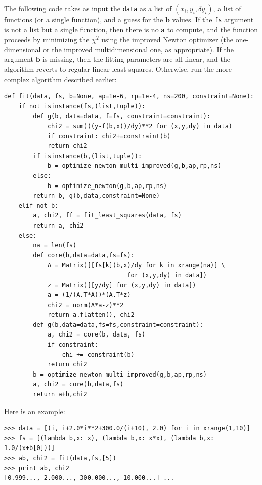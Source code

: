 \documentclass[justified,sixbynine]{tufte-book}
\def\ft{\small\tt}
\theoremstyle{plain}%
\theoremstyle{definition}
\theoremstyle{remark}
\begin{document}
\begin{fullwidth}
The following code takes as input the {\ft data} as a list of $(x_i,y_i,\delta y_i)$, a list of functions (or a single function), and a guess for the $\mathbf{b}$ values. If the {\ft fs} argument is not a list but a single function, then there is no $\mathbf{a}$ to compute, and the function proceeds by minimizing the $\chi^2$ using the improved Newton optimizer (the one-dimensional or the improved multidimensional one, as appropriate). If the argument $\mathbf{b}$ is missing, then the fitting parameters are all linear, and the algorithm reverts to regular linear least squares. Otherwise, run the more complex algorithm described earlier:

\begin{lstlisting}[caption={in file: {\ft nlib.py}}]
def fit(data, fs, b=None, ap=1e-6, rp=1e-4, ns=200, constraint=None):
    if not isinstance(fs,(list,tuple)):
        def g(b, data=data, f=fs, constraint=constraint):
            chi2 = sum(((y-f(b,x))/dy)**2 for (x,y,dy) in data)
            if constraint: chi2+=constraint(b)
            return chi2
        if isinstance(b,(list,tuple)):
            b = optimize_newton_multi_improved(g,b,ap,rp,ns)
        else:
            b = optimize_newton(g,b,ap,rp,ns)
        return b, g(b,data,constraint=None)
    elif not b:
        a, chi2, ff = fit_least_squares(data, fs)
        return a, chi2
    else:
        na = len(fs)
        def core(b,data=data,fs=fs):
            A = Matrix([[fs[k](b,x)/dy for k in xrange(na)] \
                                  for (x,y,dy) in data])
            z = Matrix([[y/dy] for (x,y,dy) in data])
            a = (1/(A.T*A))*(A.T*z)
            chi2 = norm(A*a-z)**2
            return a.flatten(), chi2
        def g(b,data=data,fs=fs,constraint=constraint):
            a, chi2 = core(b, data, fs)
            if constraint:
                chi += constraint(b)
            return chi2
        b = optimize_newton_multi_improved(g,b,ap,rp,ns)
        a, chi2 = core(b,data,fs)
        return a+b,chi2
\end{lstlisting}

Here is an example:

\begin{lstlisting}
>>> data = [(i, i+2.0*i**2+300.0/(i+10), 2.0) for i in xrange(1,10)]
>>> fs = [(lambda b,x: x), (lambda b,x: x*x), (lambda b,x: 1.0/(x+b[0]))]
>>> ab, chi2 = fit(data,fs,[5])
>>> print ab, chi2
[0.999..., 2.000..., 300.000..., 10.000...] ...
\end{lstlisting}


\end{fullwidth}
\end{document}
